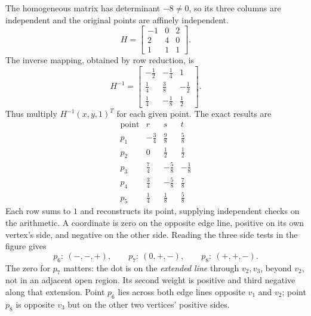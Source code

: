 The homogeneous matrix has determinant $-8\ne0$, so its three columns are independent and the original points are affinely independent.
\[H=\begin{bmatrix}-1&0&2\\2&4&0\\1&1&1\end{bmatrix}.\]
The inverse mapping, obtained by row reduction, is
\[H^{-1}=\begin{bmatrix}- \frac{1}{2}&- \frac{1}{4}&1\\\frac{1}{4}&\frac{3}{8}&- \frac{1}{2}\\\frac{1}{4}&- \frac{1}{8}&\frac{1}{2}\end{bmatrix}.\]
Thus multiply $H^{-1}(x,y,1)^T$ for each given point. The exact results are
\[\begin{array}{c|ccc}\text{point}&r&s&t\\\hline
p_1&- \frac{3}{4}&\frac{9}{8}&\frac{5}{8}\\p_2&0&\frac{1}{2}&\frac{1}{2}\\p_3&\frac{7}{4}&- \frac{5}{8}&- \frac{1}{8}\\p_4&\frac{3}{4}&- \frac{5}{8}&\frac{7}{8}\\p_5&\frac{1}{4}&\frac{1}{8}&\frac{5}{8}
\end{array}\]
Each row sums to $1$ and reconstructs its point, supplying independent checks on the arithmetic.
A coordinate is zero on the opposite edge line, positive on its own vertex's side, and negative on the other side. Reading the three side tests in the figure gives
\[
p_6:\ (-,-,+),\qquad
p_7:\ (0,+,-),\qquad
p_8:\ (+,+,-).
\]
The zero for $p_7$ matters: the dot is on the \emph{extended line} through $v_2,v_3$, beyond $v_2$, not in an adjacent open region. Its second weight is positive and third negative along that extension. Point $p_6$ lies across both edge lines opposite $v_1$ and $v_2$; point $p_8$ is opposite $v_3$ but on the other two vertices' positive sides.

